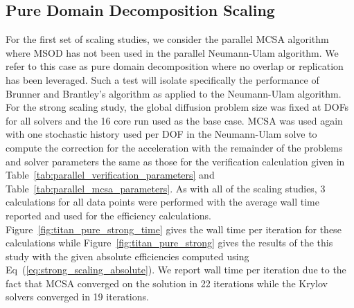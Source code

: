 \clearpage

\subsection{Pure Domain Decomposition Scaling}
\label{subsec:pure_domain_decomp}

For the first set of scaling studies, we consider the parallel MCSA
algorithm where MSOD has not been used in the parallel Neumann-Ulam
algorithm. We refer to this case as pure domain decomposition where no
overlap or replication has been leveraged. Such a test will isolate
specifically the performance of Brunner and Brantley's algorithm as
applied to the Neumann-Ulam algorithm. For the strong scaling study,
the global diffusion problem size was fixed at  DOFs for
all solvers and the 16 core run used as the base case. MCSA was used
again with one stochastic history used per DOF in the Neumann-Ulam
solve to compute the correction for the acceleration with the
remainder of the problems and solver parameters the same as those for
the verification calculation given in
Table~\ref{tab:parallel_verification_parameters} and
Table~\ref{tab:parallel_mcsa_parameters}. As with all of the scaling
studies, 3 calculations for all data points were performed with the
average wall time reported and used for the efficiency
calculations. Figure~\ref{fig:titan_pure_strong_time} gives the wall
time per iteration for these calculations while
Figure~\ref{fig:titan_pure_strong} gives the results of the this study
with the given absolute efficiencies computed using
Eq~(\ref{eq:strong_scaling_absolute}). We report wall time per
iteration due to the fact that MCSA converged on the solution in 22
iterations while the Krylov solvers converged in 19 iterations.

